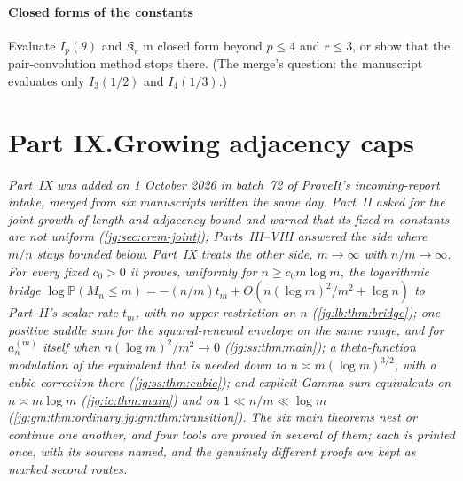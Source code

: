 \documentclass[11pt,a4paper]{article}
\theoremstyle{definition}\newaliascnt{definition}{theorem}
\theoremstyle{remark}\newaliascnt{remark}{theorem}
\newcommand{\ljP}{\mathbb P}
\begin{document}
\subsection{Closed forms of the constants}
\label{gc:sec:q-closed}
Evaluate $I_p(\theta)$ and $\mathfrak K_r$ in closed form beyond $p\le4$ and
$r\le3$, or show that the pair-convolution method stops there. (The merge's
question: the manuscript evaluates only $I_3(1/2)$ and $I_4(1/3)$.)
\clearpage
{}\part*{Part IX.\quad Growing adjacency caps}

\noindent\emph{Part~IX was added on 1 October 2026 in batch~72 of ProveIt's
incoming-report intake, merged from six manuscripts written the same day.
Part~II asked for the joint growth of length and adjacency bound and warned
that its fixed-$m$ constants are not uniform
(\cref{jg:sec:crem-joint}); Parts~III--VIII answered the side where $m/n$
stays bounded below. Part~IX treats the other side, $m\to\infty$ with
$n/m\to\infty$. For every fixed $c_0>0$ it proves, uniformly for
$n\ge c_0m\log m$, the logarithmic bridge
$\log\ljP(M_n\le m)=-(n/m)t_m+O(n(\log m)^2/m^2+\log n)$ to Part~II's scalar
rate $t_m$, with no upper restriction on $n$ (\cref{jg:lb:thm:bridge}); one
positive saddle sum for the squared-renewal envelope on the same range, and for
$a_n^{(m)}$ itself when $n(\log m)^2/m^2\to0$ (\cref{jg:ss:thm:main}); a
theta-function modulation of the equivalent that is needed down to
$n\asymp m(\log m)^{3/2}$, with a cubic correction there
(\cref{jg:ss:thm:cubic}); and explicit Gamma-sum equivalents on
$n\asymp m\log m$ (\cref{jg:ic:thm:main}) and on $1\ll n/m\ll\log m$
(\cref{jg:gm:thm:ordinary,jg:gm:thm:transition}). The six main theorems nest
or continue one another, and four tools are proved in several of them; each is
printed once, with its sources named, and the genuinely different proofs are
kept as marked second routes.}
\end{document}
